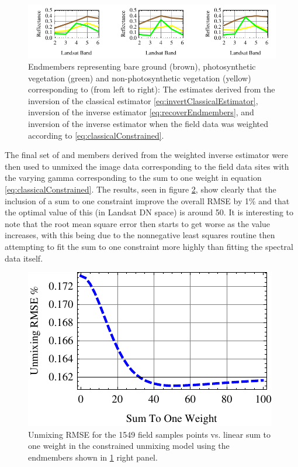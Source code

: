 \documentclass[remotesensing,article,accept,moreauthors,pdftex,12pt,a4paper]{mdpi}
\begin{document}
\begin{figure}
\includegraphics{methodsPlot.pdf}
\caption{\label{fig:inversionMethodPlots}Endmembers representing bare ground (brown), photosynthetic vegetation (green) and non-photosynthetic vegetation (yellow) corresponding to (from left to right): The estimates derived from the inversion of the classical estimator \ref{eq:invertClassicalEstimator}, inversion of the inverse estimator \ref{eq:recoverEndmembers}, and inversion of the inverse estimator when the field data was weighted according to \ref{eq:classicalConstrained}.}

\end{figure} 

The final set of and members derived from the weighted inverse estimator were then used to unmixed the image data corresponding to the field data sites with the varying gamma corresponding to the sum to one weight in equation \ref{eq:classicalConstrained}. The results, seen in figure \ref{fig:sum2one}, show clearly that the inclusion of a sum to one constraint improve the overall RMSE by 1\% and that the optimal value of this (in Landsat DN space) is around 50. It is interesting to note that the root mean square error then starts to get worse as the value increases, with this being due to the nonnegative least squares routine then attempting to fit the sum to one constraint more highly than fitting the spectral data itself.


\begin{figure}
\includegraphics{sumToOnePlot.pdf}
\caption{\label{fig:sum2one}Unmixing RMSE for the 1549 field samples points vs. linear sum to one weight in the constrained unmixing model using the endmembers shown in \ref{fig:inversionMethodPlots} right panel.}
\end{figure} 
\end{document}
